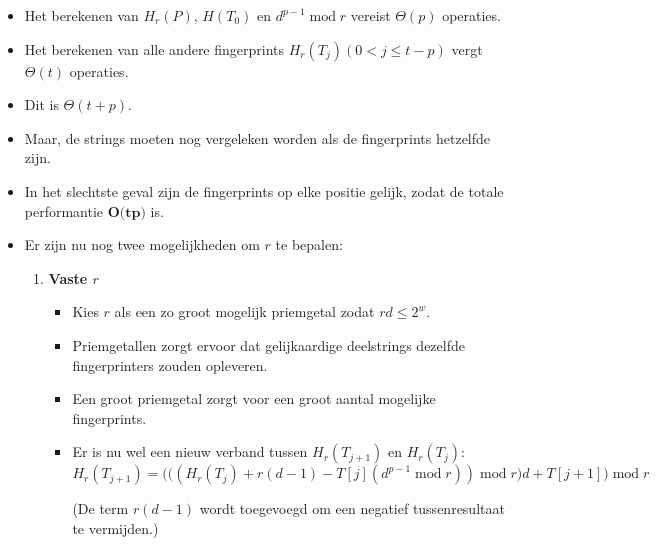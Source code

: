 \begin{itemize}
\begin{itemize}
       
    \end{itemize}
        

        \item Het berekenen van $H_r(P)$, $H(T_0)$ en $d^{p-1}\;\mathrm{mod}\;r$ vereist $\Theta(p)$ operaties.
        \item Het berekenen van alle andere fingerprints $H_r(T_j) (0 < j \leq t - p)$ vergt $\Theta(t)$ operaties.
        \item Dit is $\Theta(t + p)$.
        \item Maar, de strings moeten nog vergeleken worden als de fingerprints hetzelfde zijn.
        \item In het slechtste geval zijn de fingerprints op elke positie gelijk, zodat de totale performantie $\textbf{O(tp)}$ is.
        \item Er zijn nu nog twee mogelijkheden om $r$ te bepalen:
        \begin{enumerate}
            \item \textbf{Vaste $r$}
            \begin{itemize}
                \item Kies $r$ als een zo groot mogelijk priemgetal zodat $rd \leq 2^w$.
                \item Priemgetallen zorgt ervoor dat gelijkaardige deelstrings dezelfde fingerprinters zouden opleveren.
                \item Een groot priemgetal zorgt voor een groot aantal mogelijke fingerprints.
                \item Er is nu wel een nieuw verband tussen $H_r(T_{j + 1})$ en $H_r(T_j)$:
                $$H_r(T_{j + 1}) = \bigg(\big((H_r(T_j) + r(d - 1) - T[j](d^{p-1}\;\mathrm{mod}\;r)) \;\mathrm{mod}\;r\big)d + T[j + 1] \bigg)\;\mathrm{mod}\;r$$
                
                (De term $r(d - 1)$ wordt toegevoegd om een negatief tussenresultaat te vermijden.)
            \end{itemize}



\end{enumerate}
\end{itemize}
